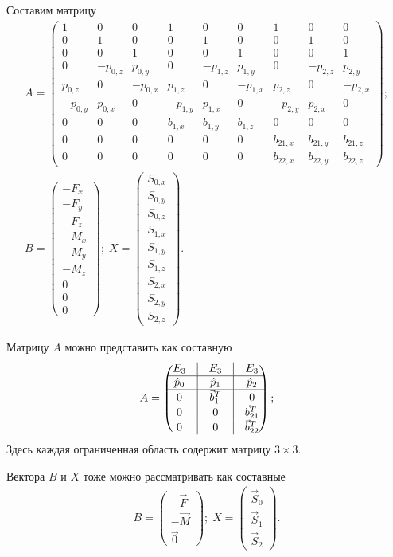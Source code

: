 Составим матрицу
\begin{gather}
	A = \begin{pmatrix}
		1 & 0 & 0 & 1 & 0 & 0 & 1 & 0 & 0 \\
		0 & 1 & 0 & 0 & 1 & 0 & 0 & 1 & 0 \\
		0 & 0 & 1 & 0 & 0 & 1 & 0 & 0 & 1 \\
		0 & -p_{0,z} & p_{0,y} & 0 & -p_{1,z} & p_{1,y} & 0 & -p_{2,z} & p_{2,y} \\
		p_{0,z} & 0 & - p_{0,x} & p_{1,z} & 0 & - p_{1,x} &	p_{2,z} & 0 & - p_{2,x} \\
		-p_{0,y} & p_{0,x} & 0 & -p_{1,y} & p_{1,x} & 0 & -p_{2,y} & p_{2,x} & 0 \\
		0 & 0 & 0 & b_{1,x} & b_{1,y} & b_{1,z} & 0 & 0 & 0 \\
		0 & 0 & 0 & 0 & 0 & 0 & b_{21,x} & b_{21,y} & b_{21,z} \\
		0 & 0 & 0 & 0 & 0 & 0 & b_{22,x} & b_{22,y} & b_{22,z}
	\end{pmatrix};\\
	B = \begin{pmatrix}
		-F_x\\
		-F_y\\
		-F_z\\
		-M_x\\
		-M_y\\
		-M_z\\
		0 \\ 0 \\ 0
	\end{pmatrix};\;
	X = \begin{pmatrix}
		S_{0,x} \\ 
		S_{0,y} \\ 
		S_{0,z} \\ 
		S_{1,x} \\ 
		S_{1,y} \\ 
		S_{1,z} \\ 
		S_{2,x} \\
		S_{2,y} \\
		S_{2,z}
	\end{pmatrix}.
\end{gather}

Матрицу $A$ можно представить как составную
\begin{gather}
	A = \begin{pmatrix}
		E_3 & \vrule & E_3 & \vrule & E_3  \\ \hline
		\hat{p}_0 & \vrule & \hat{p}_1 & \vrule & \hat{p}_2 \\ \hline
		0 & \vrule & \vec b_1^T & \vrule & 0 \\
		0 & \vrule & 0  & \vrule & \vec b_{21}^T \\
		0 & \vrule & 0  & \vrule & \vec b_{22}^T
	\end{pmatrix};\\
\end{gather}
Здесь каждая ограниченная область содержит матрицу $3\times 3$.

Вектора $B$ и $X$ тоже можно рассматривать как составные
\begin{gather}
	B = \begin{pmatrix}
		-\vec F \\
		-\vec M \\
		\vec 0
	\end{pmatrix};\;
	X = \begin{pmatrix}
		\vec S_0 \\
		\vec S_1 \\
		\vec S_2
	\end{pmatrix}.
\end{gather}
